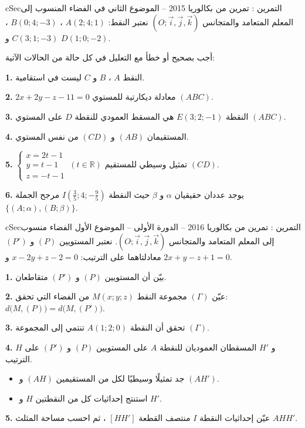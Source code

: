 \documentclass[12pt,a4paper]{article}
\newenvironment{BOX}[2]{\begin{otherlanguage}{english}\begin{arbox}{#1}{#2}}{\end{arbox}\end{otherlanguage}}
\newcounter{exo}
\newenvironment{tamrin}[1]{\stepcounter{exo}\begin{BOX}{cSec}{التمرين \theexo: #1}}{\end{BOX}}
\newcommand{\R}{\mathbb{R}}
\newenvironment{sq}{\begin{itemize}[leftmargin=2.4em,itemsep=3pt]}{\end{itemize}}
\newcommand{\qa}{\item[(أ)]}\newcommand{\qb}{\item[(ب)]}\newcommand{\qc}{\item[(جـ)]}\newcommand{\qd}{\item[(د)]}\newcommand{\qe}{\item[(هـ)]}
\newcommand{\QQ}[1]{\par\smallskip\textbf{#1.} }
\newcommand{\Rep}{(O;\vec i,\vec j,\vec k)}
\newcommand{\Sys}[1]{\left\{\begin{array}{l}#1\end{array}\right.}
\begin{document}
\begin{tamrin}{تمرين من بكالوريا 2015 -- الموضوع الثاني}
في الفضاء المنسوب إلى المعلم المتعامد والمتجانس $\Rep$ نعتبر النقط: $A(2;4;1)$ ، $B(0;4;-3)$ ، $C(3;1;-3)$ و $D(1;0;-2)$.
\par أجب بصحيح أو خطأ مع التعليل في كل حالة من الحالات الآتية:
\QQ{1} النقط $A$ ، $B$ و $C$ ليست في استقامية.
\QQ{2} $2x+2y-z-11=0$ معادلة ديكارتية للمستوي $(ABC)$.
\QQ{3} النقطة $E(3;2;-1)$ هي المسقط العمودي للنقطة $D$ على المستوي $(ABC)$.
\QQ{4} المستقيمان $(AB)$ و $(CD)$ من نفس المستوي.
\QQ{5} $\Sys{x=2t-1\\y=t-1\\z=-t-1}\ (t\in\R)$ تمثيل وسيطي للمستقيم $(CD)$.
\QQ{6} يوجد عددان حقيقيان $\alpha$ و $\beta$ حيث النقطة $I\left(\frac35;4;-\frac95\right)$ مرجح الجملة $\{(A;\alpha),(B;\beta)\}$.
\end{tamrin}
\begin{tamrin}{تمرين من بكالوريا 2016 -- الدورة الأولى -- الموضوع الأول}
الفضاء منسوب إلى المعلم المتعامد والمتجانس $\Rep$. نعتبر المستويين $(P)$ و $(P')$ معادلتاهما على الترتيب: $x-2y+z-2=0$ و $2x+y-z+1=0$.
\QQ{1} بيّن أن المستويين $(P)$ و $(P')$ متقاطعان.
\QQ{2} عيّن $(\Gamma)$ مجموعة النقط $M(x;y;z)$ من الفضاء التي تحقق: $d\big(M,(P)\big)=d\big(M,(P')\big)$.
\QQ{3} تحقق أن النقطة $A(1;2;0)$ تنتمي إلى المجموعة $(\Gamma)$.
\QQ{4} $H$ و $H'$ المسقطان العموديان للنقطة $A$ على المستويين $(P)$ و $(P')$ على الترتيب.
\begin{sq}
\qa جد تمثيلًا وسيطيًا لكل من المستقيمين $(AH)$ و $(AH')$.
\qb استنتج إحداثيات كل من النقطتين $H$ و $H'$.
\end{sq}
\QQ{5} عيّن إحداثيات النقطة $I$ منتصف القطعة $[HH']$ ، ثم احسب مساحة المثلث $AHH'$.
\end{tamrin}
\end{document}
